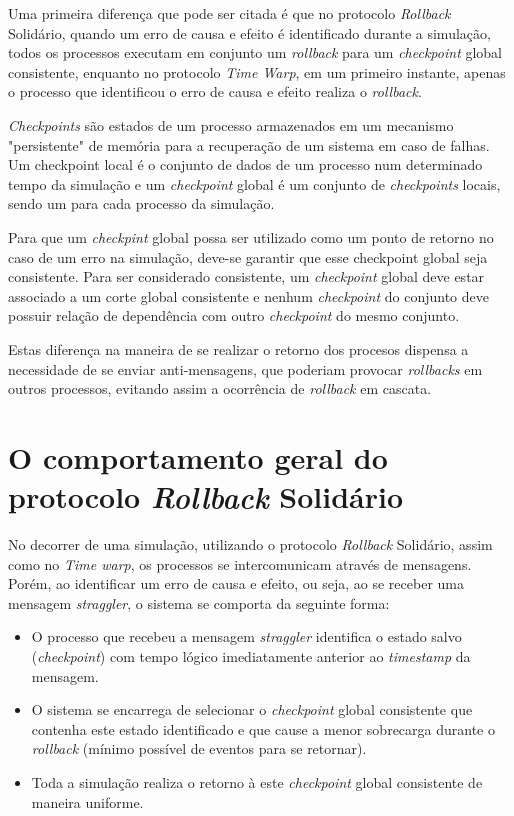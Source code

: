 	Uma primeira diferença que pode ser citada é que no protocolo \textit{Rollback} Solidário, quando um erro de causa e efeito é identificado durante a simulação, todos os processos executam em conjunto um \textit{rollback} para um \textit{checkpoint} global consistente, enquanto no protocolo \textit{Time Warp}, em um primeiro instante, apenas o processo que identificou o erro de causa e efeito realiza o \textit{rollback}.

	\textit{Checkpoints} são estados de um processo armazenados em um mecanismo "persistente" de memória para a recuperação de um sistema em caso de falhas\cite{EDMARMO}. Um checkpoint local é o conjunto de dados de um processo num determinado tempo da simulação e um \textit{checkpoint} global é um conjunto de \textit{checkpoints} locais, sendo um para cada processo da simulação.

	Para que um \textit{checkpint} global possa ser utilizado como um ponto de retorno no caso de um erro na simulação, deve-se garantir que esse checkpoint global seja consistente. Para ser considerado consistente, um \textit{checkpoint} global deve estar associado a um corte global consistente e nenhum \textit{checkpoint} do conjunto deve possuir relação de dependência com outro \textit{checkpoint} do mesmo conjunto.
	
	Estas diferença na maneira de se realizar o retorno dos procesos dispensa a necessidade de se enviar anti-mensagens, que poderiam provocar \textit{rollbacks} em outros processos, evitando assim a ocorrência de \textit{rollback} em cascata.

\section{O comportamento geral do protocolo \textit{Rollback} Solidário}
	No decorrer de uma simulação, utilizando o protocolo \textit{Rollback} Solidário, assim como no \textit{Time warp}, os processos se intercomunicam através de mensagens. Porém, ao identificar um erro de causa e efeito, ou seja, ao se receber uma mensagem \textit{straggler}, o sistema se comporta da seguinte forma:

\begin{itemize}
	\item O processo que recebeu a mensagem \textit{straggler} identifica o estado salvo (\textit{checkpoint}) com tempo lógico imediatamente anterior ao \textit{timestamp} da mensagem.
	\item O sistema se encarrega de selecionar o \textit{checkpoint} global consistente que contenha este estado identificado e que cause a menor sobrecarga durante o  \textit{rollback} (mínimo possível de eventos para se retornar).
	\item Toda a simulação realiza o retorno à este \textit{checkpoint} global consistente de maneira uniforme.
\end{itemize}

